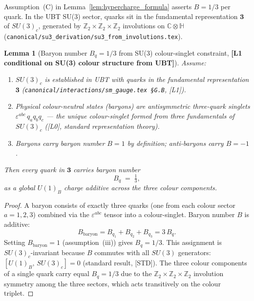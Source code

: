 \documentclass[12pt,a4paper]{article}
\newtheorem{lemma}[theorem]{Lemma}
\theoremstyle{definition}
\theoremstyle{remark}
\begin{document}
Assumption~(C) in Lemma~\ref{lem:hypercharge_formula} asserts $B=1/3$ per quark.
In the UBT SU(3) sector, quarks sit in the fundamental representation
$\mathbf{3}$ of $SU(3)_c$, generated by $\mathbb{Z}_2{\times}\mathbb{Z}_2{\times}\mathbb{Z}_2$
involutions on $\mathbb{C}\otimes\mathbb{H}$
(\texttt{canonical/su3\_derivation/su3\_from\_involutions.tex}).

\begin{lemma}[Baryon number $B_q=1/3$ from SU(3) colour-singlet constraint,
  \textbf{[L1 conditional on SU(3) colour structure from UBT]}]
\label{lem:Bq_from_su3}
Assume:
\begin{enumerate}
  \item[(i)] $SU(3)_c$ is established in UBT with quarks in the fundamental
             representation $\mathbf{3}$
             (\texttt{canonical/interactions/sm\_gauge.tex §G.B}, [L1]).
  \item[(ii)] Physical colour-neutral states (baryons) are antisymmetric three-quark
              singlets $\varepsilon^{abc}\,q_a q_b q_c$ — the unique colour-singlet
              formed from three fundamentals of $SU(3)_c$ ([L0], standard representation theory).
  \item[(iii)] Baryons carry baryon number $B=1$ by definition; anti-baryons carry $B=-1$.
\end{enumerate}
Then every quark in $\mathbf{3}$ carries baryon number
\begin{equation}
  \boxed{B_q \;=\; \tfrac{1}{3},}
  \label{eq:Bq_one_third}
\end{equation}
as a global $U(1)_B$ charge additive across the three colour components.
\end{lemma}

\begin{proof}
A baryon consists of exactly three quarks (one from each colour sector $a=1,2,3$)
combined via the $\varepsilon^{abc}$ tensor into a colour-singlet.
Baryon number $B$ is additive:
\[
  B_{\mathrm{baryon}} = B_{q_1} + B_{q_2} + B_{q_3} = 3\,B_q.
\]
Setting $B_{\mathrm{baryon}} = 1$ (assumption~(iii)) gives $B_q = 1/3$.
This assignment is $SU(3)_c$-invariant because $B$ commutes with all $SU(3)$
generators: $[U(1)_B,\, SU(3)_c] = 0$ (standard result, [STD]).
The three colour components of a single quark carry equal $B_q=1/3$ due to
the $\mathbb{Z}_2{\times}\mathbb{Z}_2{\times}\mathbb{Z}_2$ involution symmetry
among the three sectors, which acts transitively on the colour triplet.
\end{proof}
\end{document}
